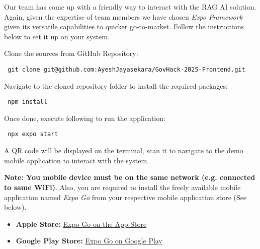 Our team has come up with a friendly way to interact with the RAG AI solution.
Again, given the expertise of team members we have chosen \emph{Expo Framework} given its versatile capabilities to quicker go-to-market.
Follow the instructions below to set it up on your system.

Clone the sources from GitHub Repository:
\begin{lstlisting}
 git clone git@github.com:AyeshJayasekara/GovHack-2025-Frontend.git
\end{lstlisting}

Navigate to the cloned repository folder to install the required packages:
\begin{lstlisting}
 npm install
\end{lstlisting}

Once done, execute following to run the application:
\begin{lstlisting}
 npx expo start
\end{lstlisting}

A QR code will be displayed on the terminal, scan it to navigate to the demo mobile application to interact with the system.

\textbf{Note: You mobile device must be on the same network (e.g. connected to same WiFi)}.
Also, you are required to install the freely available mobile application named \emph{Expo Go} from your respective mobile application store (See below).

\begin{itemize}
    \item \textbf{Apple Store:} \href{https://apps.apple.com/us/app/expo-go/id982107779}{Expo Go on the App Store}
    \item \textbf{Google Play Store:} \href{https://play.google.com/store/apps/details?id=host.exp.exponent&hl=en_AU&pli=1}{Expo Go on Google Play}
\end{itemize}




